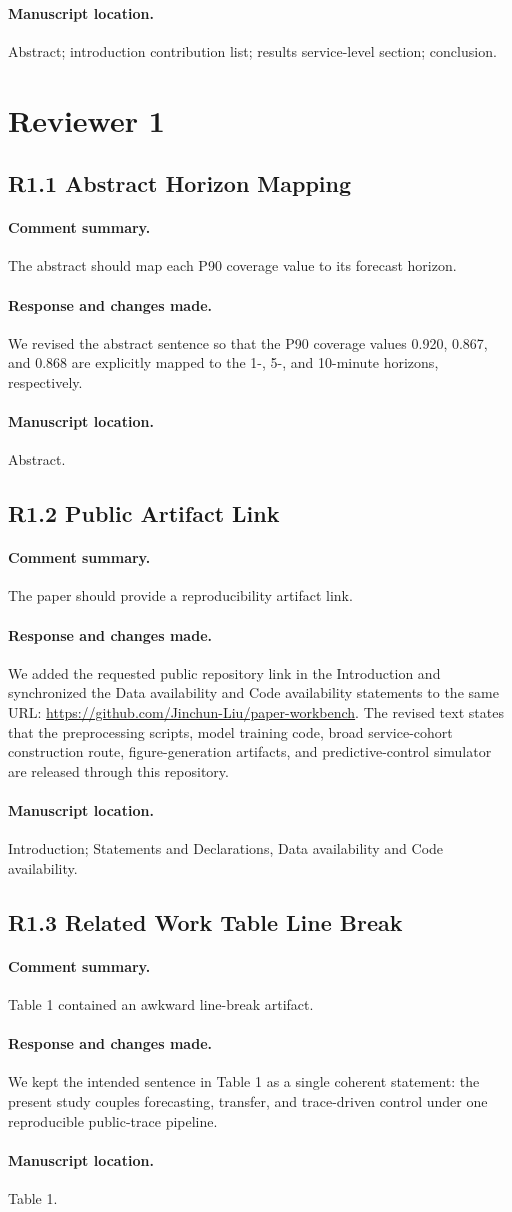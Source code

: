 \documentclass[11pt]{article}
\newcommand{\resp}[3]{\paragraph{Comment summary.} #1\par\paragraph{Response and changes made.} #2\par\paragraph{Manuscript location.} #3\par}
\begin{document}
\paragraph{Manuscript location.} Abstract; introduction contribution list; results service-level section; conclusion.

\section*{Reviewer 1}

\subsection*{R1.1 Abstract Horizon Mapping}
\resp{The abstract should map each P90 coverage value to its forecast horizon.}{We revised the abstract sentence so that the P90 coverage values 0.920, 0.867, and 0.868 are explicitly mapped to the 1-, 5-, and 10-minute horizons, respectively.}{Abstract.}

\subsection*{R1.2 Public Artifact Link}
\paragraph{Comment summary.} The paper should provide a reproducibility artifact link.
\paragraph{Response and changes made.} We added the requested public repository link in the Introduction and synchronized the Data availability and Code availability statements to the same URL: \url{https://github.com/Jinchun-Liu/paper-workbench}. The revised text states that the preprocessing scripts, model training code, broad service-cohort construction route, figure-generation artifacts, and predictive-control simulator are released through this repository.
\paragraph{Manuscript location.} Introduction; Statements and Declarations, Data availability and Code availability.

\subsection*{R1.3 Related Work Table Line Break}
\resp{Table 1 contained an awkward line-break artifact.}{We kept the intended sentence in Table 1 as a single coherent statement: the present study couples forecasting, transfer, and trace-driven control under one reproducible public-trace pipeline.}{Table 1.}
\end{document}
